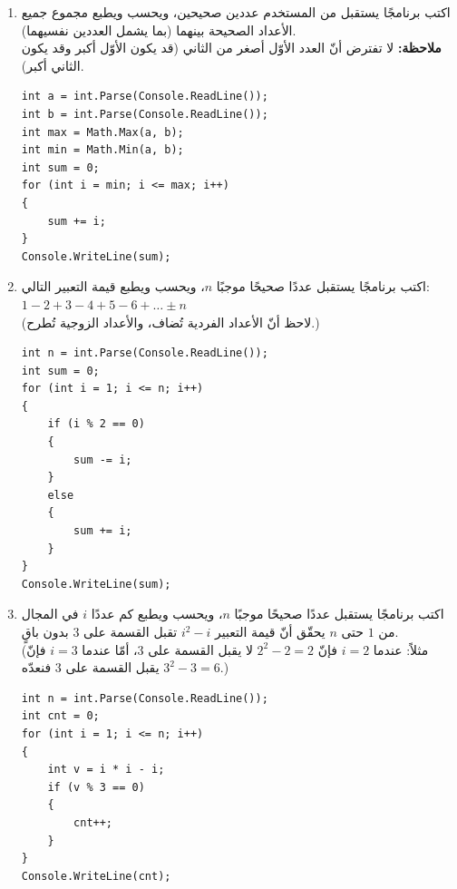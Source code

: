 \documentclass[14pt]{extarticle}
\begin{document}
\begin{enumerate}[resume, itemsep=2em]

\item اكتب برنامجًا يستقبل من المستخدم عددين صحيحين، ويحسب ويطبع مجموع جميع الأعداد الصحيحة بينهما (بما يشمل العددين نفسيهما). \\
\textbf{ملاحظة:} لا تفترض أنّ العدد الأوّل أصغر من الثاني (قد يكون الأوّل أكبر وقد يكون الثاني أكبر).
\ifwithsols
\begin{boxSolution}
\begin{english}
\begin{verbatim}
int a = int.Parse(Console.ReadLine());
int b = int.Parse(Console.ReadLine());
int max = Math.Max(a, b);
int min = Math.Min(a, b);
int sum = 0;
for (int i = min; i <= max; i++)
{
    sum += i;
}
Console.WriteLine(sum);
\end{verbatim}
\end{english}
\end{boxSolution}
\fi
\filbreak

\item اكتب برنامجًا يستقبل عددًا صحيحًا موجبًا $n$، ويحسب ويطبع قيمة التعبير التالي: \\
$1 - 2 + 3 - 4 + 5 - 6 + \dots \pm n$ \\
(لاحظ أنّ الأعداد الفردية تُضاف، والأعداد الزوجية تُطرح.)
\ifwithsols
\begin{boxSolution}
\begin{english}
\begin{verbatim}
int n = int.Parse(Console.ReadLine());
int sum = 0;
for (int i = 1; i <= n; i++)
{
    if (i % 2 == 0)
    {
        sum -= i;
    }
    else
    {
        sum += i;
    }
}
Console.WriteLine(sum);
\end{verbatim}
\end{english}
\end{boxSolution}
\fi
\filbreak

\item اكتب برنامجًا يستقبل عددًا صحيحًا موجبًا $n$، ويحسب ويطبع كم عددًا $i$ في المجال من $1$ حتى $n$ يحقّق أنّ قيمة التعبير $i^2 - i$ تقبل القسمة على $3$ بدون باقٍ. \\
(مثلاً: عندما $i = 2$ فإنّ $2^2 - 2 = 2$ لا يقبل القسمة على $3$، أمّا عندما $i = 3$ فإنّ $3^2 - 3 = 6$ يقبل القسمة على $3$ فنعدّه.)
\ifwithsols
\begin{boxSolution}
\begin{english}
\begin{verbatim}
int n = int.Parse(Console.ReadLine());
int cnt = 0;
for (int i = 1; i <= n; i++)
{
    int v = i * i - i;
    if (v % 3 == 0)
    {
        cnt++;
    }
}
Console.WriteLine(cnt);
\end{verbatim}
\end{english}
\end{boxSolution}
\fi
\filbreak


\end{enumerate}
\end{document}
